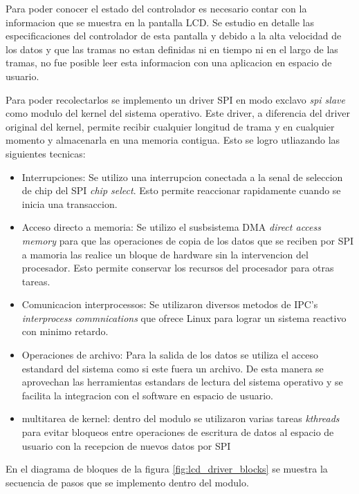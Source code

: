       Para poder conocer el estado del controlador es necesario contar con la informacion que se muestra en la pantalla LCD. 
      Se estudio en detalle las especificaciones del controlador de esta pantalla y debido a la alta velocidad de los datos y que las tramas no estan definidas ni en tiempo ni en el largo de las tramas, no fue posible leer esta informacion con una aplicacion en espacio de usuario. \par
      Para poder recolectarlos se implemento un driver SPI en modo exclavo \textit{spi slave} como modulo del kernel del sistema operativo.
      Este driver, a diferencia del driver original del kernel, permite recibir cualquier longitud de trama y en cualquier momento y almacenarla en una memoria contigua.
      Esto se logro utliazando las siguientes tecnicas:
      \begin{itemize}
         \item {Interrupciones: Se utilizo una interrupcion conectada a la senal de seleccion de chip del SPI \textit{chip select}. Esto permite reaccionar rapidamente cuando se inicia una transaccion.}
         \item {Acceso directo a memoria: Se utilizo el susbsistema DMA \textit{direct access memory} para que las operaciones de copia de los datos que se reciben por SPI a mamoria las realice un bloque de hardware sin la intervencion del procesador. Esto permite conservar los recursos del procesador para otras tareas.}
         \item{Comunicacion interprocessos: Se utilizaron diversos metodos de IPC's \textit{interprocess commnications} que ofrece Linux para lograr un sistema reactivo con minimo retardo.}
         \item{Operaciones de archivo: Para la salida de los datos se utiliza el acceso estandard del sistema como si este fuera un archivo. De esta manera se aprovechan las herramientas estandars de lectura del sistema operativo y se facilita la integracion con el software en espacio de usuario.}
         \item{multitarea de kernel: dentro del modulo se utilizaron varias tareas \textit{kthreads} para evitar bloqueos entre operaciones de escritura de datos al espacio de usuario con la recepcion de nuevos datos por SPI}
      \end{itemize}

      En el diagrama de bloques de la figura \ref{fig:lcd_driver_blocks} se muestra la secuencia de pasos que se implemento dentro del modulo. 
      
